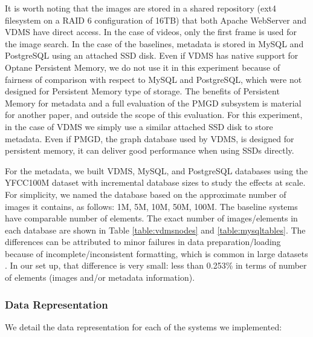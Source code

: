 It is worth noting that the images are stored in a shared repository
(ext4 filesystem on a RAID 6 configuration of 16TB) that both
Apache WebServer and VDMS have direct access.
In the case of videos, only the first frame is used for the image search.
In the case of the baselines, metadata is
stored in MySQL and PostgreSQL using an attached SSD disk.
Even if VDMS has native support for Optane Persistent Memory,
we do not use it in this experiment because of fairness of
comparison with respect to MySQL and PostgreSQL, which were not designed for
Persistent Memory type of storage.
The benefits of Persistent Memory for metadata and a full evaluation of
the PMGD subsystem is material for another paper,
and outside the scope of this evaluation.
For this experiment, in the case of VDMS we simply use a similar
attached SSD disk to store metadata.
Even if PMGD, the graph database used by VDMS, is designed for persistent memory,
it can deliver good performance when using SSDs directly.

For the metadata, we built VDMS, MySQL, and PostgreSQL databases using
the YFCC100M dataset with incremental database sizes to study the effects at scale.
For simplicity, we named the database based on the approximate number of images
it contains, as follows: 1M, 5M, 10M, 50M, 100M.
The baseline systems have comparable number of elements.
The exact number of images/elements in each database are shown in
Table \ref{table:vdmsnodes} and \ref{table:mysqltables}.
The differences can be attributed to minor failures in data
preparation/loading because of incomplete/inconsistent formatting,
which is common in large datasets \cite{failures}.
In our set up, that difference is very small: less than 0.253\% in terms of
number of elements (images and/or metadata information).

\subsubsection{Data Representation}
We detail the data representation for each of the systems we implemented:

